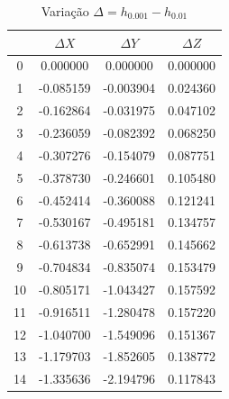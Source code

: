 \documentclass[12pt, a4paper]{article}
\begin{document}
    \begin{table}[H]
        \centering
        \footnotesize %
        \begin{tabular}{|c|c|c|c|}
        \toprule
        & $\Delta X$ & $\Delta Y$ & $\Delta Z$ \\
        \midrule
        0 & 0.000000 & 0.000000 & 0.000000 \\
        1 & -0.085159 & -0.003904 & 0.024360 \\
        2 & -0.162864 & -0.031975 & 0.047102 \\
        3 & -0.236059 & -0.082392 & 0.068250 \\
        4 & -0.307276 & -0.154079 & 0.087751 \\
        5 & -0.378730 & -0.246601 & 0.105480 \\
        6 & -0.452414 & -0.360088 & 0.121241 \\
        7 & -0.530167 & -0.495181 & 0.134757 \\
        8 & -0.613738 & -0.652991 & 0.145662 \\
        9 & -0.704834 & -0.835074 & 0.153479 \\
        10 & -0.805171 & -1.043427 & 0.157592 \\
        11 & -0.916511 & -1.280478 & 0.157220 \\
        12 & -1.040700 & -1.549096 & 0.151367 \\
        13 & -1.179703 & -1.852605 & 0.138772 \\
        14 & -1.335636 & -2.194796 & 0.117843 \\
        \bottomrule
        \end{tabular}
        \caption{Variação $\Delta = h_{0.001} - h_{0.01}$}
    \end{table}
    
\end{document}
